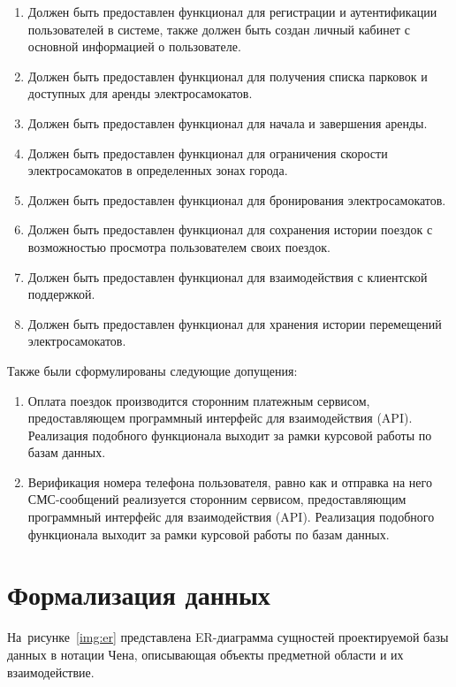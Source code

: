 \begin{enumerate}
    \item Должен быть предоставлен функционал для регистрации и аутентификации пользователей в системе, также должен быть создан личный кабинет с основной информацией о пользователе.
    \item Должен быть предоставлен функционал для получения списка парковок и доступных для аренды электросамокатов.
    \item Должен быть предоставлен функционал для начала и завершения аренды.
    \item Должен быть предоставлен функционал для ограничения скорости электросамокатов в определенных зонах города.
    \item Должен быть предоставлен функционал для бронирования электросамокатов.
    \item Должен быть предоставлен функционал для сохранения истории поездок с возможностью просмотра пользователем своих поездок.
    \item Должен быть предоставлен функционал для взаимодействия с клиентской поддержкой.
    \item Должен быть предоставлен функционал для хранения истории перемещений электросамокатов.
\end{enumerate}

Также были сформулированы следующие допущения:

\begin{enumerate}
    \item Оплата поездок производится сторонним платежным сервисом, предоставляющем программный интерфейс для взаимодействия (API). Реализация подобного функционала выходит за рамки курсовой работы по базам данных.
    \item Верификация номера телефона пользователя, равно как и отправка на него СМС-сообщений реализуется сторонним сервисом, предоставляющим программный интерфейс для взаимодействия (API). Реализация подобного функционала выходит за рамки курсовой работы по базам данных.
\end{enumerate}

\section{Формализация данных}

На~рисунке~\ref{img:er} представлена ER-диаграмма сущностей проектируемой базы данных в нотации Чена, описывающая объекты предметной области и их взаимодействие.

